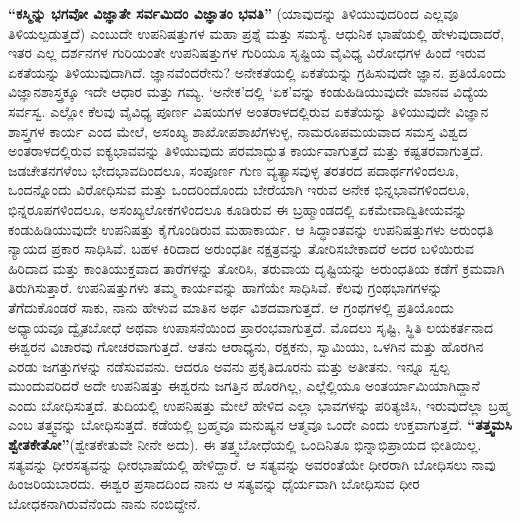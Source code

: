 \textbf{“ಕಸ್ಮಿನ್ನು ಭಗವೋ ವಿಜ್ಞಾತೇ ಸರ್ವಮಿದಂ ವಿಜ್ಞಾತಂ ಭವತಿ”} (ಯಾವುದನ್ನು ತಿಳಿಯುವುದರಿಂದ ಎಲ್ಲವೂ ತಿಳಿಯಲ್ಪಡುತ್ತದೆ) ಎಂಬುದೇ ಉಪನಿಷತ್ತುಗಳ ಮಹಾ ಪ್ರಶ್ನೆ ಮತ್ತು ಸಮಸ್ಯೆ. ಆಧುನಿಕ ಭಾಷೆಯಲ್ಲಿ ಹೇಳುವುದಾದರೆ, ಇತರ ಎಲ್ಲ ದರ್ಶನಗಳ ಗುರಿಯಂತೇ ಉಪನಿಷತ್ತುಗಳ ಗುರಿಯೂ ಸೃಷ್ಟಿಯ ವೈವಿಧ್ಯ ವಿರೋಧಗಳ ಹಿಂದೆ ಇರುವ ಏಕತೆಯನ್ನು ತಿಳಿಯುವುದಾಗಿದೆ. ಜ್ಞಾನವೆಂದರೇನು? ಅನೇಕತೆಯಲ್ಲಿ ಏಕತೆಯನ್ನು ಗ್ರಹಿಸುವುದೇ ಜ್ಞಾನ. ಪ್ರತಿಯೊಂದು ವಿಜ್ಞಾನಶಾಸ್ತ್ರಕ್ಕೂ ಇದೇ ಆಧಾರ ಮತ್ತು ಗಮ್ಯ. ‘ಅನೇಕ’ದಲ್ಲಿ ‘ಏಕ’ವನ್ನು ಕಂಡುಹಿಡಿಯುವುದೇ ಮಾನವ ವಿದ್ಯೆಯ ಸರ್ವಸ್ವ. ಎಲ್ಲೋ ಕೆಲವು ವೈವಿಧ್ಯ ಪೂರ್ಣ ವಿಷಯಗಳ ಅಂತರಾಳದಲ್ಲಿರುವ ಏಕತೆಯನ್ನು ತಿಳಿಯುವುದೇ ವಿಜ್ಞಾನ ಶಾಸ್ತ್ರಗಳ ಕಾರ್ಯ ಎಂದ ಮೇಲೆ, ಅಸಂಖ್ಯ ಶಾಖೋಪಶಾಖೆಗಳುಳ್ಳ, ನಾಮರೂಪಮಯವಾದ ಸಮಸ್ತ ವಿಶ್ವದ ಅಂತರಾಳದಲ್ಲಿರುವ ಐಕ್ಯಭಾವವನ್ನು ತಿಳಿಯುವುದು ಪರಮಾದ್ಭುತ ಕಾರ್ಯವಾಗುತ್ತದೆ ಮತ್ತು ಕಷ್ಟತರವಾಗುತ್ತದೆ. ಜಡಚೇತನಗಳೆಂಬ ಭೇದಭಾವದಿಂದಲೂ, ಸಂಪೂರ್ಣ ಗುಣ ವ್ಯತ್ಯಾಸವುಳ್ಳ ತರತರದ ಪದಾರ್ಥಗಳಿಂದಲೂ, ಒಂದನ್ನೊಂದು ವಿರೋಧಿಸುವ ಮತ್ತು ಒಂದರಿಂದೊಂದು ಬೇರೆಯಾಗಿ ಇರುವ ಅನೇಕ ಭಿನ್ನಭಾವಗಳಿಂದಲೂ, ಭಿನ್ನರೂಪಗಳಿಂದಲೂ, ಅಸಂಖ್ಯಲೋಕಗಳಿಂದಲೂ ಕೂಡಿರುವ ಈ ಬ್ರಹ್ಮಾಂಡದಲ್ಲಿ ಏಕಮೇವಾದ್ವಿತೀಯವನ್ನು ಕಂಡುಹಿಡಿಯುವುದೇ ಉಪನಿಷತ್ತು ಕೈಗೊಂಡಿರುವ ಮಹಾಕಾರ್ಯ. ಆ ಸಿದ್ಧಾಂತವನ್ನು ಉಪನಿಷತ್ತುಗಳು ಅರುಂಧತಿ ನ್ಯಾಯದ ಪ್ರಕಾರ ಸಾಧಿಸಿವೆ. ಬಹಳ ಕಿರಿದಾದ ಅರುಂಧತೀ ನಕ್ಷತ್ರವನ್ನು ತೋರಿಸಬೇಕಾದರೆ ಅದರ ಬಳಿಯಿರುವ ಹಿರಿದಾದ ಮತ್ತು ಕಾಂತಿಯುಕ್ತವಾದ ತಾರೆಗಳನ್ನು ತೋರಿಸಿ, ತರುವಾಯ ದೃಷ್ಟಿಯನ್ನು ಅರುಂಧತಿಯ ಕಡೆಗೆ ಕ್ರಮವಾಗಿ ತಿರುಗಿಸುತ್ತಾರೆ. ಉಪನಿಷತ್ತುಗಳು ತಮ್ಮ ಕಾರ್ಯವನ್ನು ಹಾಗೆಯೇ ಸಾಧಿಸಿವೆ. ಕೆಲವು ಗ್ರಂಥಭಾಗಗಳನ್ನು ತೆಗೆದುಕೊಂಡರೆ ಸಾಕು, ನಾನು ಹೇಳುವ ಮಾತಿನ ಅರ್ಥ ವಿಶದವಾಗುತ್ತದೆ. ಆ ಗ್ರಂಥಗಳಲ್ಲಿ ಪ್ರತಿಯೊಂದು ಅಧ್ಯಾಯವೂ ದ್ವೈತಬೋಧೆ ಅಥವಾ ಉಪಾಸನೆಯಿಂದ ಪ್ರಾರಂಭವಾಗುತ್ತದೆ. ಮೊದಲು ಸೃಷ್ಟಿ, ಸ್ಥಿತಿ ಲಯಕರ್ತನಾದ ಈಶ್ವರನ ವಿಚಾರವು ಗೋಚರವಾಗುತ್ತದೆ. ಆತನು ಆರಾಧ್ಯನು, ರಕ್ಷಕನು, ಸ್ವಾಮಿಯು, ಒಳಗಿನ ಮತ್ತು ಹೊರಗಿನ ಎರಡು ಜಗತ್ತುಗಳನ್ನು ನಡೆಸುವವನು. ಆದರೂ ಅವನು ಪ್ರಕೃತಿದೂರನು ಮತ್ತು ಅತೀತನು. ಇನ್ನೂ ಸ್ವಲ್ಪ ಮುಂದುವರಿದರೆ ಅದೇ ಉಪನಿಷತ್ತು ಈಶ್ವರನು ಜಗತ್ತಿನ ಹೊರಗಿಲ್ಲ, ಎಲ್ಲೆಲ್ಲಿಯೂ ಅಂತರ್ಯಾಮಿಯಾಗಿದ್ದಾನೆ ಎಂದು ಬೋಧಿಸುತ್ತದೆ. ತುದಿಯಲ್ಲಿ ಉಪನಿಷತ್ತು ಮೇಲೆ ಹೇಳಿದ ಎಲ್ಲಾ ಭಾವಗಳನ್ನು ಪರಿತ್ಯಜಿಸಿ, ಇರುವುದೆಲ್ಲಾ ಬ್ರಹ್ಮ ಎಂಬ ತತ್ತ್ವವನ್ನು ಬೋಧಿಸುತ್ತದೆ. ಕಡೆಯಲ್ಲಿ ಬ್ರಹ್ಮವೂ ಮನುಷ್ಯನ ಆತ್ಮವೂ ಒಂದೇ ಎಂದು ಉಕ್ತವಾಗುತ್ತದೆ. \textbf{“ತತ್ತ್ವಮಸಿ ಶ್ವೇತಕೇತೋ”}(ಶ್ವೇತಕೇತುವೇ ನೀನೇ ಅದು). ಈ ತತ್ತ್ವಬೋಧೆಯಲ್ಲಿ ಒಂದಿನಿತೂ ಭಿನ್ನಾಭಿಪ್ರಾಯದ ಭೀತಿಯಿಲ್ಲ. ಸತ್ಯವನ್ನು ಧೀರಸತ್ಯವನ್ನು ಧೀರಭಾಷೆಯಲ್ಲಿ ಹೇಳಿದ್ದಾರೆ. ಆ ಸತ್ಯವನ್ನು ಅವರಂತೆಯೇ ಧೀರರಾಗಿ ಬೋಧಿಸಲು ನಾವು ಹಿಂಜರಿಯಬಾರದು. ಈಶ್ವರ ಪ್ರಸಾದದಿಂದ ನಾನು ಆ ಸತ್ಯವನ್ನು ಧೈರ್ಯವಾಗಿ ಬೋಧಿಸುವ ಧೀರ ಬೋಧಕನಾಗಿರುವೆನೆಂದು ನಾನು ನಂಬಿದ್ದೇನೆ. 


